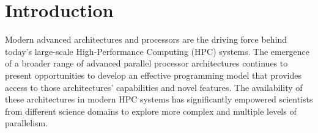 \documentclass[conference]{IEEEtran}
\begin{document}
\section{Introduction}\label{sec:intro}

Modern advanced architectures and processors are the driving force behind
today’s large-scale High-Performance Computing (HPC) systems. The emergence of
a broader range of advanced parallel processor architectures continues to present
opportunities to develop an effective programming model that provides access to
those architectures' capabilities and novel features.
%
The availability of these architectures in modern HPC systems has significantly
empowered scientists from different science domains to explore  more complex and
multiple levels of parallelism.
\end{document}
